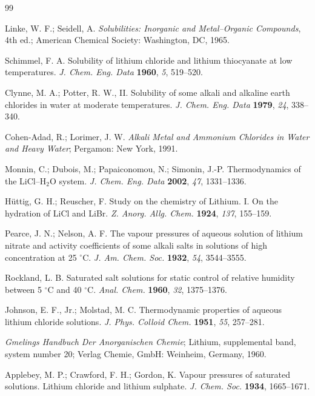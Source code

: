\documentclass[11pt]{article}
\begin{document}
\begin{thebibliography}{99}
\footnotesize

 Linke, W. F.; Seidell, A. \textit{Solubilities: Inorganic and
Metal--Organic Compounds}, 4th ed.; American Chemical Society: Washington, DC,
1965.

 Schimmel, F. A. Solubility of lithium chloride and lithium
thiocyanate at low temperatures. \textit{J. Chem. Eng. Data} \textbf{1960},
\textit{5}, 519--520.

 Clynne, M. A.; Potter, R. W., II. Solubility of some alkali and
alkaline earth chlorides in water at moderate temperatures. \textit{J. Chem.
Eng. Data} \textbf{1979}, \textit{24}, 338--340.

 Cohen-Adad, R.; Lorimer, J. W. \textit{Alkali Metal and
Ammonium Chlorides in Water and Heavy Water}; Pergamon: New York, 1991.

 Monnin, C.; Dubois, M.; Papaiconomou, N.; Simonin, J.-P.
Thermodynamics of the LiCl--H$_2$O system. \textit{J. Chem. Eng. Data}
\textbf{2002}, \textit{47}, 1331--1336.

 H\"uttig, G. H.; Reuscher, F. Study on the chemistry of
Lithium. I. On the hydration of LiCl and LiBr. \textit{Z. Anorg. Allg. Chem.}
\textbf{1924}, \textit{137}, 155--159.

 Pearce, J. N.; Nelson, A. F. The vapour pressures of aqueous
solution of lithium nitrate and activity coefficients of some alkali salts in
solutions of high concentration at 25 $^{\circ}$C. \textit{J. Am. Chem. Soc.}
\textbf{1932}, \textit{54}, 3544--3555.

 Rockland, L. B. Saturated salt solutions for static control of
relative humidity between 5 $^{\circ}$C and 40 $^{\circ}$C. \textit{Anal.
Chem.} \textbf{1960}, \textit{32}, 1375--1376.

 Johnson, E. F., Jr.; Molstad, M. C. Thermodynamic properties of
aqueous lithium chloride solutions. \textit{J. Phys. Colloid Chem.}
\textbf{1951}, \textit{55}, 257--281.

 \textit{Gmelings Handbuch Der Anorganischen Chemie}; Lithium,
supplemental band, system number 20; Verlag Chemie, GmbH: Weinheim, Germany,
1960.

 Applebey, M. P.; Crawford, F. H.; Gordon, K. Vapour pressures
of saturated solutions. Lithium chloride and lithium sulphate. \textit{J.
Chem. Soc.} \textbf{1934}, 1665--1671.


\end{thebibliography}
\end{document}
